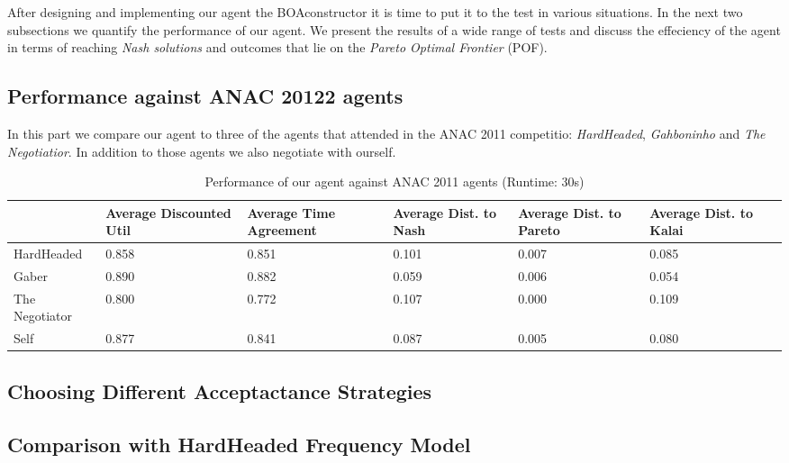 After designing and implementing our agent the BOAconstructor it is time to put it to the test in various situations. In the next two subsections we quantify the performance of our agent. We present the results of a wide range of tests and discuss the effeciency of the agent in terms of reaching \emph{Nash solutions} and outcomes that lie on the \emph{Pareto Optimal Frontier} (POF).

\subsection{Performance against ANAC 20122 agents}

In this part we compare our agent to three of the agents that attended in the ANAC 2011 competitio: \emph{HardHeaded}, \emph{Gahboninho} and \emph{The Negotiatior}. In addition to those agents we also negotiate with ourself. 

\begin{table}
	\small
    \begin{tabular}{l|p{2cm}|p{2cm}|p{2cm}|p{2cm}|p{2cm}|p{2cm}|}
    ~              & Average Discounted Util & Average Time Agreement & Average Dist. to Nash & Average Dist. to Pareto & Average Dist. to Kalai \\
    \hline
    HardHeaded     & 0.858                & 0.851               & 0.101              & 0.007                & 0.085               \\ \hline
    Gaber          & 0.890                & 0.882               & 0.059              & 0.006                & 0.054               \\ \hline
    The Negotiator & 0.800                & 0.772               & 0.107              & 0.000                & 0.109               \\ \hline
    Self           & 0.877                & 0.841               & 0.087              & 0.005                & 0.080               \\ 
    \hline
    \end{tabular}
    \caption{Performance of our agent against ANAC 2011 agents (Runtime: $30$s)}
\end{table}

\subsection{Choosing Different Acceptactance Strategies}

\subsection{Comparison with HardHeaded Frequency Model}

